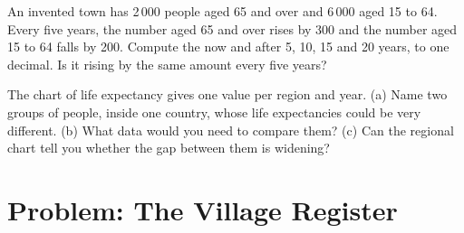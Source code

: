 \begin{exercise}[$\star\star\star$]\label{exo:g6:health-and-population:11}
An invented town has 2\,000 people aged 65 and over and 6\,000 aged 15 to 64.
Every five years, the number aged 65 and over rises by 300 and the number aged 15
to 64 falls by 200. Compute the  now and after 5, 10, 15
and 20 years, to one decimal. Is it rising by the same amount every five years?
\end{exercise}

\begin{exercise}[$\star\star\star$]\label{exo:g6:health-and-population:12}
The chart of life expectancy gives one value per region and year. (a) Name two
groups of people, inside one country, whose life expectancies could be very
different. (b) What data would you need to compare them? (c) Can the regional
chart tell you whether the gap between them is widening?
\end{exercise}

\section{Problem: The Village Register}

